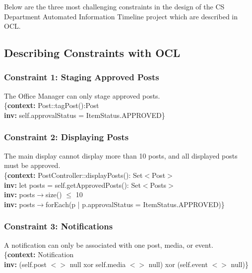Below are the three most challenging constraints in the design of the CS Department Automated Information Timeline project which are described in OCL.

\subsection{Describing Constraints with OCL}

\subsubsection{Constraint 1: Staging Approved Posts}

The Office Manager can only stage approved posts. \\

\{\textbf{context:} Post::tagPost():Post \\
\textbf{inv:} self.approvalStatus = ItemStatus.APPROVED\} \\

\subsubsection{Constraint 2: Displaying Posts}

The main display cannot display more than 10 posts, and all displayed posts must be approved. \\

\{\textbf{context:} PostController::displayPosts(): Set$<$Post$>$ \\
\textbf{inv:} let posts = self.getApprovedPosts(): Set$<$Posts$>$ \\
\textbf{inv:} posts$\rightarrow$size() $\leq$ 10 \\
\textbf{inv:} posts$\rightarrow$forEach(p | p.approvalStatus = ItemStatus.APPROVED)\} \\

\subsubsection{Constraint 3: Notifications}

A notification can only be associated with one post, media, or event. \\

\{\textbf{context:} Notification \\
\textbf{inv:} (self.post $<$$>$ null xor self.media $<$$>$ null) xor (self.event $<$$>$ null)\}  \\
